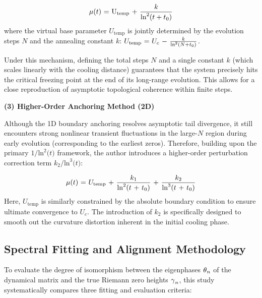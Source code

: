 \documentclass[mca,article,submit,oneauthor,pdftex]{Definitions/mdpi}
\begin{document}
\begin{equation}
\text{\ensuremath{\mu}}\text{(}{t}\text{)~=~}\text{U}_{\text{temp}}\text{~+~}\frac{{k}}{\text{ln}^{\text{2}}\text{(}{t}+{t}_{\text{0}}\text{)}}
\end{equation}
where the virtual base parameter \({U}_{\text{temp}}\) is jointly
determined by the evolution steps \({N}\) and the annealing
constant \({k}\):
\({U}_{\text{temp}}\text{~=~}{U}_{{c}}\text{\ensuremath{~-~}}\frac{{k}}{\text{ln}^{\text{2}}\text{(}{N}+{t}_{\text{0}}\text{)}}\).

Under this mechanism, defining the total steps \({N}\) and a single
constant \({k}\) (which scales linearly with the cooling distance)
guarantees that the system precisely hits the critical freezing point at
the end of its long-range evolution. This allows for a close
reproduction of asymptotic topological coherence within finite steps.

\textbf{(3) Higher-Order Anchoring Method (2D)}

Although the 1D boundary anchoring resolves asymptotic tail divergence,
it still encounters strong nonlinear transient fluctuations in the
large-$N$ region during early evolution (corresponding to the earliest
zeros). Therefore, building upon the primary
\(\text{1/}\text{ln}^{\text{2}}\text{(}{t}\text{)}\) framework, the author introduces a higher-order perturbation correction term
\({k}_{\text{2}}\text{/}\text{ln}^{\text{3}}\text{(}{t}\text{)}\):

\begin{equation}
\text{\ensuremath{\mu}}\text{(}{t}\text{) = }{U}_{\text{temp}}\text{ + }\frac{{k}_{\text{1}}}{\text{ln}^{\text{2}}\text{(}{t}\text{ + }{t}_{\text{0}}\text{)}}\text{ + }\frac{{k}_{\text{2}}}{\text{ln}^{\text{3}}\text{(}{t}\text{ + }{t}_{\text{0}}\text{)}}
\end{equation}
Here, \({U}_{\text{temp}}\) is similarly constrained by the
absolute boundary condition to ensure ultimate convergence to
\({U}_{{c}}\). The introduction of \({k}_{\text{2}}\) is
specifically designed to smooth out the curvature distortion inherent in
the initial cooling phase.

\subsection{Spectral Fitting and Alignment Methodology}\label{sec:spectral-fitting-methodology}

To evaluate the degree of isomorphism between the eigenphases
\(\text{\ensuremath{\theta}}_{{n}}\) of the dynamical matrix and the true Riemann
zero heights \(\text{\ensuremath{\gamma}}_{{n}}\), this study systematically compares
three fitting and evaluation criteria:
\end{document}
